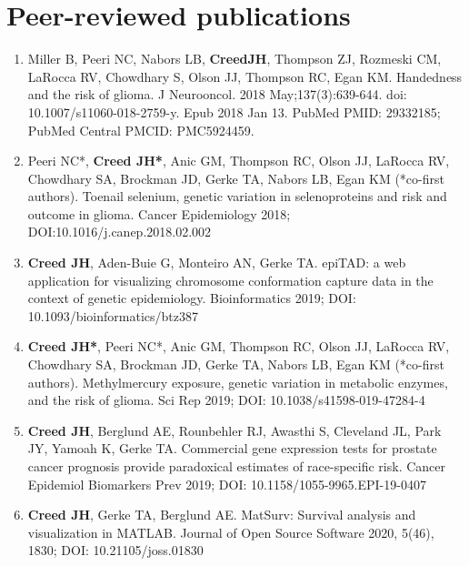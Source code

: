 \documentclass[11pt, a4paper]{article} %
\newcommand{\years}[1]{\marginnote{\scriptsize \raise .3ex\hbox{#1}}} %
\begin{document}

\section*{Peer-reviewed publications}
\begin{enumerate}[leftmargin=*]

\item{} Miller B, Peeri NC, Nabors LB, {\bf CreedJH}, Thompson ZJ, Rozmeski CM, LaRocca RV, Chowdhary S, Olson JJ, Thompson RC, Egan KM. Handedness and the risk of glioma. J
Neurooncol. 2018 May;137(3):639-644. doi: 10.1007/s11060-018-2759-y. Epub 2018
Jan 13. PubMed PMID: 29332185; PubMed Central PMCID: PMC5924459.

\item{} Peeri NC*, {\bf Creed JH*}, Anic GM, Thompson RC, Olson JJ, LaRocca RV, Chowdhary SA, Brockman JD, Gerke TA, Nabors LB, Egan KM (*co-first authors). Toenail selenium, genetic variation in selenoproteins and risk and outcome in glioma. Cancer Epidemiology 2018; DOI:10.1016/j.canep.2018.02.002

\item{} {\bf Creed JH}, Aden-Buie G, Monteiro AN, Gerke TA. epiTAD: a web application for visualizing  chromosome conformation capture data in the context of genetic epidemiology. Bioinformatics 2019; DOI: 10.1093/bioinformatics/btz387

\item{} {\bf Creed JH*}, Peeri NC*, Anic GM, Thompson RC, Olson JJ, LaRocca RV, Chowdhary SA, Brockman JD, Gerke TA, Nabors LB, Egan KM (*co-first authors). Methylmercury exposure, genetic variation in metabolic enzymes, and the risk of glioma. Sci Rep 2019; DOI: 10.1038/s41598-019-47284-4

\item{} {\bf Creed JH}, Berglund AE, Rounbehler RJ, Awasthi S, Cleveland JL, Park JY, Yamoah K, Gerke TA. Commercial gene expression tests for prostate cancer prognosis provide paradoxical estimates of race-specific risk. Cancer Epidemiol Biomarkers Prev 2019; DOI: 10.1158/1055-9965.EPI-19-0407

\item{} {\bf Creed JH}, Gerke TA, Berglund AE. MatSurv: Survival analysis and visualization in MATLAB. Journal of Open Source Software 2020, 5(46), 1830; DOI: 10.21105/joss.01830


\end{enumerate}
\end{document}
